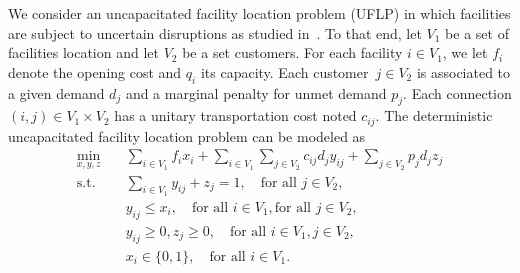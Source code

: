 We consider an uncapacitated facility location problem (UFLP) in which
facilities are subject to uncertain disruptions as studied
in~\textcite{Cheng2021}. To that end, let $V_1$ be a set of facilities
location and let $V_2$ be a set customers. For each facility $i\in V_1$, we
let $f_i$ denote the opening cost and $q_i$ its capacity. Each customer~$j\in
V_2$ is associated to a given demand $d_j$ and a marginal penalty for unmet
demand $p_j$. Each connection $(i,j)\in V_1\times V_2$ has a unitary
transportation cost noted $c_{ij}$. The deterministic uncapacitated facility
location problem can be modeled as 
%
\begin{subequations}
    \label{eq:ccg:uflp}
    \begin{align}
        \min_{x,y,z} \quad & \sum_{i\in V_1} f_ix_i + \sum_{i\in V_1} \sum_{j\in V_2} c_{ij} d_j y_{ij} + \sum_{j\in V_2} p_jd_jz_j \\
        \text{s.t.} \quad & \sum_{i\in V_1} y_{ij} + z_j = 1, \quad \text{for all } j\in V_2, \label{eq:ccg:uflp:assignment} \\
        & y_{ij} \le x_i, \quad \text{for all } i\in V_1, \text{for all } j\in V_2,  \label{eq:ccg:uflp:activation} \\
        & y_{ij}\ge 0, z_j \ge 0, \quad \text{for all } i\in V_1, j\in V_2, \label{eq:ccg:uflp:non-negative} \\
        & x_i\in\{0,1\}, \quad \text{for all } i\in V_1.
    \end{align}
\end{subequations}

